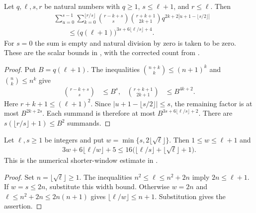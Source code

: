 \begin{theorem}
    \label{thm:aklv_frequency_sum_bound}
    \leanok
    Let $q,\ell,s,r$ be natural numbers with $q\ge1$, $s\le\ell+1$, and
    $r\le\ell$. Then
    \begin{align*}
         & \sum_{u=0}^{s-1}\sum_{k=0}^{\lfloor r/s\rfloor}
        \binom{r-k+s}{s}\binom{r+k+1}{2k+1}
        q^{2k+2|u+1-\lfloor s/2\rfloor|}                                      \\
         & \hspace{2em}\le\bigl(q(\ell+1)\bigr)^{3s+6\lfloor\ell/s\rfloor+4}.
    \end{align*}
    For $s=0$ the sum is empty and natural division by zero is taken to be zero.
    These are the scalar bounds in \cite[Lemma~4.2]{Arad2013AreaLaw}, with the
    corrected count from \cite{gap:aklv13_interpolation_and_word_count}.
\end{theorem}
\begin{proof}
    \leanok
    Put $B=q(\ell+1)$.
    The inequalities $\binom{n+k}{k}\le(n+1)^k$ and
    $\binom{n}{k}\le n^k$ give
    \begin{align*}
        \binom{r-k+s}{s}    & \le B^s,      &
        \binom{r+k+1}{2k+1} & \le B^{4k+2}.
    \end{align*}
    Here $r+k+1\le(\ell+1)^2$. Since $|u+1-\lfloor s/2\rfloor|\le s$,
    the remaining factor is at most $B^{2k+2s}$.
    Each summand is therefore at most $B^{3s+6\lfloor\ell/s\rfloor+2}$.
    There are $s(\lfloor r/s\rfloor+1)\le B^2$ summands.
\end{proof}

\begin{theorem}
    \label{thm:aklv_effective_width_bound}
    \leanok
    Let $\ell,s\ge1$ be integers and put
    $w=\min\{s,2\lfloor\sqrt\ell\rfloor\}$. Then $1\le w\le\ell+1$ and
    \begin{align*}
        3w+6\lfloor\ell/w\rfloor+5
        \le16\bigl(\lfloor\ell/s\rfloor+\lfloor\sqrt\ell\rfloor+1\bigr).
    \end{align*}
    This is the numerical shorter-window estimate in
    \cite[Lemma~4.2]{Arad2013AreaLaw}.
\end{theorem}
\begin{proof}
    \leanok
    Set $n=\lfloor\sqrt\ell\rfloor\ge1$.
    The inequalities $n^2\le\ell\le n^2+2n$ imply $2n\le\ell+1$.
    If $w=s\le2n$, substitute this width bound.
    Otherwise $w=2n$ and
    $\ell\le n^2+2n\le2n(n+1)$ gives
    $\lfloor\ell/w\rfloor\le n+1$. Substitution gives the assertion.
\end{proof}
